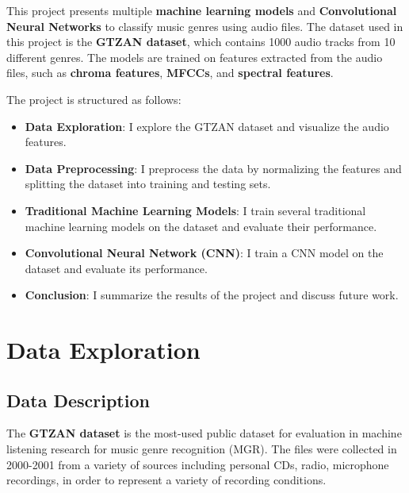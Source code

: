 \documentclass[11.5pt]{article}
\begin{document}
This project presents multiple \textbf{machine learning models} and \textbf{Convolutional Neural Networks} to classify music genres using audio files. The dataset used in this project is the \textbf{GTZAN dataset}, which contains 1000 audio tracks from 10 different genres. The models are trained on features extracted from the audio files, such as \textbf{chroma features}, \textbf{MFCCs}, and \textbf{spectral features}.

The project is structured as follows:
\begin{itemize}
    \item \textbf{Data Exploration}: I explore the GTZAN dataset and visualize the audio features.
    \item \textbf{Data Preprocessing}: I preprocess the data by normalizing the features and splitting the dataset into training and testing sets.
    \item \textbf{Traditional Machine Learning Models}: I train several traditional machine learning models on the dataset and evaluate their performance.
    \item \textbf{Convolutional Neural Network (CNN)}: I train a CNN model on the dataset and evaluate its performance.
    \item \textbf{Conclusion}: I summarize the results of the project and discuss future work.
\end{itemize}

\section{Data Exploration} \label{sec:data_exploration}
\subsection{Data Description}
The \textbf{GTZAN dataset} is the most-used public dataset for evaluation in machine listening research for music genre recognition (MGR). The files were collected in 2000-2001 from a variety of sources including personal CDs, radio, microphone recordings, in order to represent a variety of recording conditions.\cite{GTZANDatasetMusic}
\end{document}
